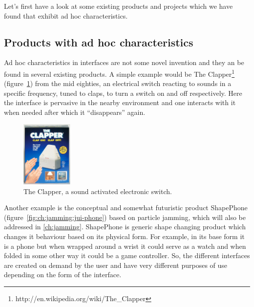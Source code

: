 Let's first have a look at some existing products and projects which we have found that exhibit ad hoc characteristics. 

\subsection{Products with ad hoc characteristics}
Ad hoc characteristics in interfaces are not some novel invention and they an be found in several existing products.
A simple example would be The Clapper\footnote{http://en.wikipedia.org/wiki/The\_Clapper} (figure~\ref{ch:adhoc:theclapper}) from the mid eighties, an electrical switch reacting to sounds in a specific frequency, tuned to claps, to turn a switch on and off respectively.
Here the interface is pervasive in the nearby environment and one interacts with it when needed after which it ``disappears'' again.

\begin{figure}[hb]
	\centering
  		\includegraphics[width=1in]{figures/theclapper}
	\caption[The Clapper, a sound activated electronic switch.]
   {The Clapper, a sound activated electronic switch.}
   \label{ch:adhoc:theclapper}
\end{figure}

Another example is the conceptual and somewhat futuristic product ShapePhone (figure~\ref{fig:ch:jamming:jui-phone}) based on particle jamming, which will also be addressed in \autoref{ch:jamming}.
ShapePhone is generic shape changing product which changes it behaviour based on its physical form.
For example, in its base form it is a phone but when wrapped around a wrist it could serve as a watch and when folded in some other way it could be a game controller.
So, the different interfaces are created on demand by the user and have very different purposes of use depending on the form of the interface.

